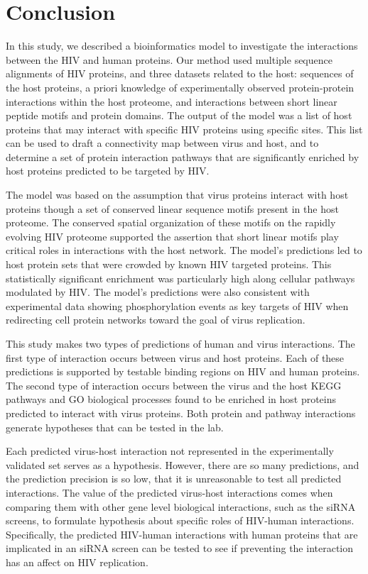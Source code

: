 \section{Conclusion}


In this study, we described a bioinformatics model to investigate the
interactions between the HIV and human proteins. Our method used
multiple sequence alignments of HIV proteins, and three datasets
related to the host: sequences of the host proteins, a priori
knowledge of experimentally observed protein-protein interactions
within the host proteome, and interactions between short linear
peptide motifs and protein domains. The output of the model was a list
of host proteins that may interact with specific HIV proteins using
specific sites. This list can be used to draft a connectivity map
between virus and host, and to determine a set of protein interaction
pathways that are significantly enriched by host proteins predicted to
be targeted by HIV.

The model was based on the assumption that virus proteins interact
with host proteins though a set of conserved linear sequence motifs
present in the host proteome. The conserved spatial organization of
these motifs on the rapidly evolving HIV proteome supported the
assertion that short linear motifs play critical roles in interactions
with the host network. The model's predictions led to host protein
sets that were crowded by known HIV targeted proteins. This
statistically significant enrichment was particularly high along
cellular pathways modulated by HIV. The model's predictions were also
consistent with experimental data showing phosphorylation events as
key targets of HIV when redirecting cell protein networks toward the
goal of virus replication.

This study makes two types of predictions of human and virus
interactions. The first type of interaction occurs between virus and
host proteins. Each of these predictions is supported by testable
binding regions on HIV and human proteins. The second type of
interaction occurs between the virus and the host KEGG pathways and GO
biological processes found to be enriched in host proteins predicted
to interact with virus proteins. Both protein and pathway interactions
generate hypotheses that can be tested in the lab.

Each predicted virus-host interaction not represented in the
experimentally validated set serves as a hypothesis. However, there
are so many predictions, and the prediction precision is so low, that
it is unreasonable to test all predicted interactions. The value of
the predicted virus-host interactions comes when comparing them with
other gene level biological interactions, such as the siRNA screens,
to formulate hypothesis about specific roles of HIV-human
interactions. Specifically, the predicted HIV-human interactions with
human proteins that are implicated in an siRNA screen can be tested to
see if preventing the interaction has an affect on HIV replication.

